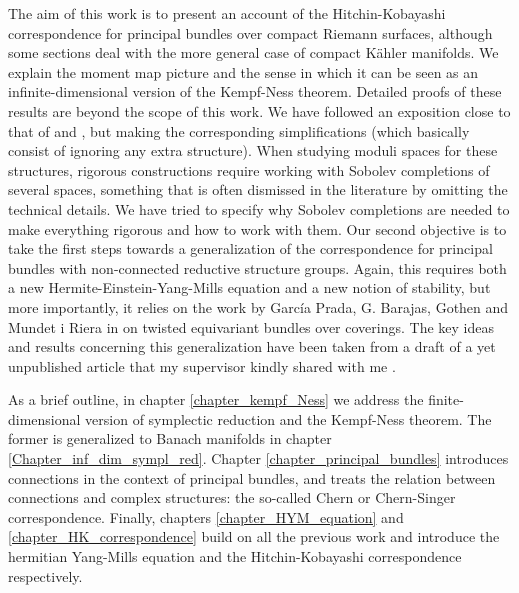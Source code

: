 The aim of this work is to present an account of the Hitchin-Kobayashi correspondence for principal bundles over compact Riemann surfaces, although some sections deal with the more general case of compact Kähler manifolds. We explain the moment map picture and the sense in which it can be seen as an infinite-dimensional version of the Kempf-Ness theorem. Detailed proofs of these results are beyond the scope of this work. We have followed an exposition close to that of \parencite{i1999hitchin} and \parencite{garcia2009hitchin}, but making the corresponding simplifications (which basically consist of ignoring any extra structure). When studying moduli spaces for these structures, rigorous constructions require working with Sobolev completions of several spaces, something that is often dismissed in the literature by omitting the technical details. We have tried to specify why Sobolev completions are needed to make everything rigorous and how to work with them. Our second objective is to take the first steps towards a generalization of the correspondence for principal bundles with non-connected reductive structure groups. Again, this requires both a new Hermite-Einstein-Yang-Mills equation and a new notion of stability, but more importantly, it relies on the work by García Prada, G. Barajas, Gothen and Mundet i Riera in \parencite{barajas2023non} on twisted equivariant bundles over coverings. The key ideas and results concerning this generalization have been taken from a draft of a yet unpublished article that my supervisor kindly shared with me \parencite{HKnonconnected}.    

\thispagestyle{introduction}
As a brief outline, in chapter \ref{chapter_kempf_Ness} we address the finite-dimensional version of symplectic reduction and the Kempf-Ness theorem. The former is generalized to Banach manifolds in chapter \ref{Chapter_inf_dim_sympl_red}. Chapter \ref{chapter_principal_bundles} introduces connections in the context of principal bundles, and treats the relation between connections and complex structures: the so-called Chern or Chern-Singer correspondence. Finally, chapters \ref{chapter_HYM_equation} and \ref{chapter_HK_correspondence} build on all the previous work and introduce the hermitian Yang-Mills equation and the Hitchin-Kobayashi correspondence respectively.   

